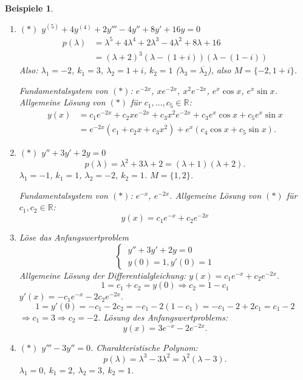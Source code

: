 \documentclass[12pt]{extreport} %
\newcommand{\R}{\mathbb{R}}
\theoremstyle{named}
\theoremstyle{nnamed}
\theoremstyle{itshape}
\theoremstyle{normal}
\newtheorem*{beispiele}{Beispiele}
\begin{document}
\begin{beispiele} ~\
	\begin{enumerate}
		\item $(*)$ $y^{(5)} + 4 y^{(4)} + 2y''' - 4y'' + 8 y' + 16y = 0$
			\begin{align*}
				p(\lambda) & = \lambda^{5} + 4 \lambda^{4} + 2 \lambda^{3} - 4 \lambda^{2} + 8 \lambda + 16 \\
				& = \left( \lambda + 2 \right)^{3} \left( \lambda - (1+i) \right) \left( \lambda - (1-i) \right)
			\end{align*}
			Also: $\lambda_{1} = -2$, $k_{1} = 3$, $\lambda_{2} = 1 + i$, $k_{2} = 1$ ($\lambda_{3} = \overline{\lambda_{2}}$), also $M = \{ -2 , 1+i \}$. 
			
			\bigskip
			
			Fundamentalsystem von $(*)$: $e^{-2x}$, $x e^{-2x}$, $x^{2} e^{-2x}$, $e^{x} \cos x$, $e^{x} \sin x$. Allgemeine Lösung von $(*)$ für $c_{1}, \dotsc, c_{5} \in \R$:
			\begin{align*}
				y(x) & = c_{1} e^{-2x} + c_{2} x e^{-2x} + c_{3} x^{2} e^{-2x} + c_{3} e^{x} \cos x + c_{5} e^{x} \sin x \\
					& = e^{-2x} \left( c_{1} + c_{2} x + c_{3} x^{2} \right) + e^{x} \left( c_{4} \cos x + c_{5} \sin x \right).
			\end{align*}
		\item $(*)$ $y'' + 3 y' + 2y = 0$
			$$ p(\lambda) = \lambda^{2} + 3\lambda + 2 = (\lambda + 1) ( \lambda + 2). $$
			$\lambda_{1} = -1$, $k_{1} = 1$, $\lambda_{2} = -2$, $k_{2} = 1$. $M = \{1, 2\}$.
			
			\bigskip
			
			Fundamentalsystem von $(*)$: $e^{-x}$, $e^{-2x}$. Allgemeine Lösung von $(*)$ für $c_{1}, c_{2} \in \R$:
			$$ y(x) = c_{1} e^{-x} + c_{2} e^{-2x} $$
		\item Löse das Anfangswertproblem
			$$ \begin{cases} ~y'' + 3y' + 2y = 0 \\ ~ y(0) = 1, y'(0) = 1 \end{cases} $$
			Allgemeine Lösung der Differentialgleichung: $y(x) = c_{1} e^{-x} + c_{2} e^{-2x}$.
			$$ 1 = c_{1} + c_{2} = y(0) \Rightarrow c_{2} = 1 - c_{1} $$
			$y'(x) = - c_{1} e^{-x} - 2 c_{2} e^{-2x}$.
			$$ 1 = y'(0) = -c_{1} - 2 c_{2} = -c_{1} - 2(1-c_{1}) = -c_{1} - 2 + 2c_{1} = c_{1} - 2 $$
			$\Rightarrow c_{1} = 3 \Rightarrow c_{2} = -2$. Lösung des Anfangswertproblems:
			$$ y(x) = 3 e^{-x} - 2 e^{-2x}. $$ 
		\item $(*)$ $y''' - 3y'' = 0$. Charakteristische Polynom:
			$$ p(\lambda) = \lambda^{3} - 3\lambda^{2} = \lambda^{2} \left( \lambda - 3\right). $$
			$\lambda_{1} = 0$, $k_{1} = 2$, $\lambda_{2} = 3$, $k_{2} = 1$.
			

\end{enumerate}
\end{beispiele}
\end{document}
